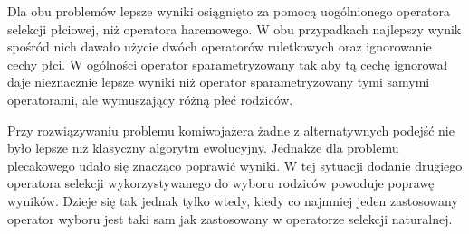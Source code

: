 \documentclass[./FM_mgr.tex]{subfiles}
\begin{document}
Dla obu problemów lepsze wyniki osiągnięto za pomocą uogólnionego operatora selekcji płciowej, niż operatora haremowego.
W obu przypadkach najlepszy wynik spośród nich dawało użycie dwóch operatorów ruletkowych oraz ignorowanie cechy płci.
W ogólności operator sparametryzowany tak aby tą cechę ignorował daje nieznacznie lepsze wyniki niż operator sparametryzowany tymi samymi operatorami, ale wymuszający różną płeć rodziców.

Przy rozwiązywaniu problemu komiwojażera żadne z alternatywnych podejść nie było lepsze niż klasyczny algorytm ewolucyjny.
Jednakże dla problemu plecakowego udało się znacząco poprawić wyniki.
W tej sytuacji dodanie drugiego operatora selekcji wykorzystywanego do wyboru rodziców powoduje poprawę wyników.
Dzieje się tak jednak tylko wtedy, kiedy co najmniej jeden zastosowany operator wyboru jest taki sam jak zastosowany w operatorze selekcji naturalnej.
\end{document}
